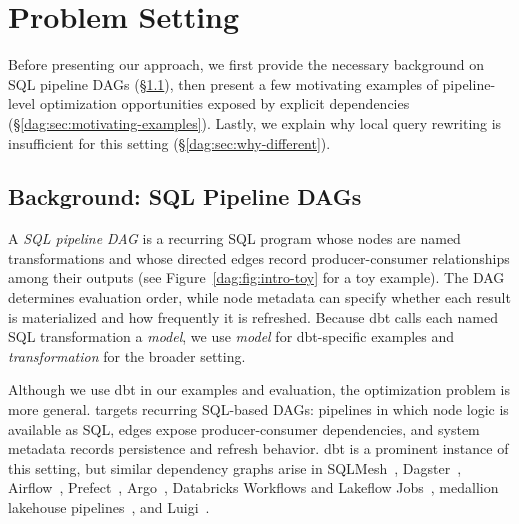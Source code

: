 \section{Problem Setting}
\label{dag:sec:motivating}

Before presenting our approach, we first provide the necessary background on SQL pipeline DAGs (\S\ref{dag:sec:dbt-setting}), then present a few motivating examples of pipeline-level optimization opportunities exposed by explicit dependencies (\S\ref{dag:sec:motivating-examples}). Lastly, we explain why local query rewriting is insufficient for this setting (\S\ref{dag:sec:why-different}).

\subsection{Background: SQL Pipeline DAGs}
\label{dag:sec:dbt-setting}

 A \emph{SQL pipeline DAG} is a recurring SQL program whose nodes are named transformations and whose directed edges record producer-consumer relationships among their outputs (see Figure~\ref{dag:fig:intro-toy} for a toy example). The DAG determines evaluation order, while node metadata can specify whether each result is materialized and how frequently it is refreshed. Because dbt calls each named SQL transformation a \emph{model}, we use \emph{model} for dbt-specific examples and \emph{transformation} for the broader setting. 
 

Although we use dbt in our examples and evaluation, the optimization problem is more general. \dagsmith targets recurring SQL-based DAGs: pipelines in which node logic is available as SQL, edges expose producer-consumer dependencies, and system metadata records persistence and refresh behavior. dbt is a prominent instance of this setting, but similar dependency graphs arise in SQLMesh~\cite{sqlmeshOverview}, Dagster~\cite{dagsterAssets}, Airflow~\cite{airflowDags}, Prefect~\cite{prefectTasks}, Argo~\cite{argoDag}, Databricks Workflows and Lakeflow Jobs~\cite{databricksJobs}, medallion lakehouse pipelines~\cite{databricksMedallion}, and Luigi~\cite{luigiDocs}.


